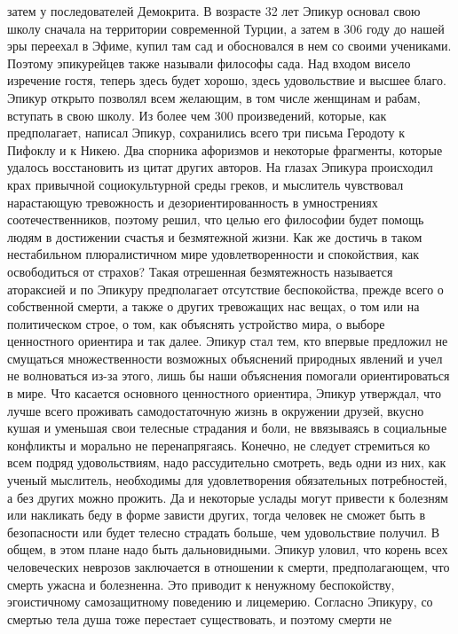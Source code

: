 затем у последователей Демокрита. В возрасте 32 лет Эпикур основал свою школу
сначала на территории современной Турции, а затем в 306 году до нашей эры
переехал в Эфиме, купил там сад и обосновался в нем со своими учениками. Поэтому
эпикурейцев также называли философы сада. Над входом висело изречение гостя,
теперь здесь будет хорошо, здесь удовольствие и высшее благо. Эпикур открыто
позволял всем желающим, в том числе женщинам и рабам, вступать в свою школу. Из
более чем 300 произведений, которые, как предполагает, написал Эпикур,
сохранились всего три письма Геродоту к Пифоклу и к Никею. Два спорника
афоризмов и некоторые фрагменты, которые удалось восстановить из цитат других
авторов. На глазах Эпикура происходил крах привычной социокультурной среды
греков, и мыслитель чувствовал нарастающую тревожность и дезориентированность в
умнострениях соотечественников, поэтому решил, что целью его философии будет
помощь людям в достижении счастья и безмятежной жизни. Как же достичь в таком
нестабильном плюралистичном мире удовлетворенности и спокойствия, как
освободиться от страхов? Такая отрешенная безмятежность называется атораксией и
по Эпикуру предполагает отсутствие беспокойства, прежде всего о собственной
смерти, а также о других тревожащих нас вещах, о том или на политическом строе,
о том, как объяснять устройство мира, о выборе ценностного ориентира и так
далее. Эпикур стал тем, кто впервые предложил не смущаться множественности
возможных объяснений природных явлений и учел не волноваться из-за этого, лишь
бы наши объяснения помогали ориентироваться в мире. Что касается основного
ценностного ориентира, Эпикур утверждал, что лучше всего проживать
самодостаточную жизнь в окружении друзей, вкусно кушая и уменьшая свои телесные
страдания и боли, не ввязываясь в социальные конфликты и морально не
перенапрягаясь. Конечно, не следует стремиться ко всем подряд удовольствиям,
надо рассудительно смотреть, ведь одни из них, как ученый мыслитель, необходимы
для удовлетворения обязательных потребностей, а без других можно прожить. Да и
некоторые услады могут привести к болезням или накликать беду в форме зависти
других, тогда человек не сможет быть в безопасности или будет телесно страдать
больше, чем удовольствие получил. В общем, в этом плане надо быть дальновидными.
Эпикур уловил, что корень всех человеческих неврозов заключается в отношении к
смерти, предполагающем, что смерть ужасна и болезненна. Это приводит к ненужному
беспокойству, эгоистичному самозащитному поведению и лицемерию. Согласно
Эпикуру, со смертью тела душа тоже перестает существовать, и поэтому смерти не
